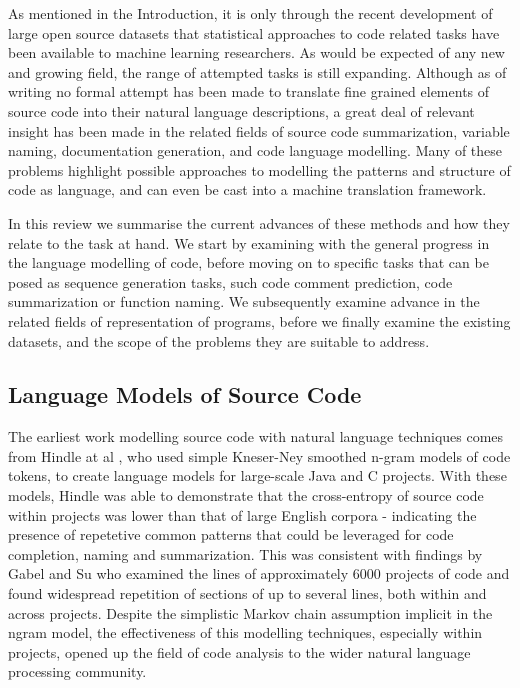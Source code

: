 As mentioned in the Introduction, it is only through the recent development of large open source datasets that statistical approaches to code related tasks have been available to machine learning researchers. 
As would be expected of any new and growing field, the range of attempted tasks is still expanding. 
Although as of writing no formal attempt has been made to translate fine grained elements of source code into their natural language descriptions, a great deal of relevant insight has been made in the related fields of source code summarization, variable naming, documentation generation, and code language modelling. Many of these problems highlight possible approaches to modelling the patterns and structure of code as language, and can even be cast into a machine translation framework.  

In this review we summarise the current advances of these methods and how they relate to the task at hand.  We start by examining with the general progress in the language modelling of code, before moving on to specific tasks that can be posed as sequence generation tasks, such code comment prediction, code summarization or function naming. We subsequently examine advance in the related fields of representation of programs, before we finally examine the existing datasets, and the scope of the problems they are suitable to address. 

\subsection{Language Models of Source Code}

The earliest work modelling source code with natural language techniques comes from Hindle at al \cite{hindle_naturalness_nodate}, who used simple Kneser-Ney smoothed n-gram models of code tokens, to create language models for large-scale Java and C projects.
With these models, Hindle was able to demonstrate that the cross-entropy of source code within projects was lower than that of large English corpora - indicating the presence of repetetive common patterns that could be leveraged for code completion, naming and summarization.
This was consistent with findings by Gabel and Su \cite{gabel_study_2010} who examined the lines of approximately 6000 projects of code and found widespread repetition of sections of up to several lines, both within and across projects.
Despite the simplistic Markov chain assumption implicit in the ngram model, the effectiveness of this modelling techniques, especially within projects, opened up the field of code analysis to the wider natural language processing community.

